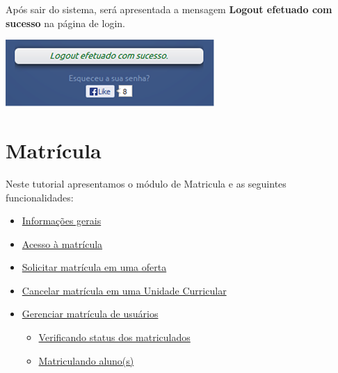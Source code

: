\documentclass[letterpaper,10pt,english]{sphinxmanual}
\begin{document}
Após sair do sistema, será apresentada a mensagem \textbf{Logout efetuado com sucesso} na página de login.

{\hfill\includegraphics{logout-02.png}\hfill}


\section{Matrícula}
\label{enrollment:matricula}\label{enrollment:enrollment}\label{enrollment::doc}
Neste tutorial apresentamos o módulo de Matricula e as seguintes funcionalidades:
\begin{itemize}
\item {} 
{\hyperref[enrollment:informacoes-gerais]{Informações gerais}}

\item {} 
{\hyperref[enrollment:acesso-a-matricula]{Acesso à matrícula}}

\item {} 
{\hyperref[enrollment:solicitar-matricula-em-uma-oferta]{Solicitar matrícula em uma oferta}}

\item {} 
{\hyperref[enrollment:cancelar-matricula-em-uma-unidade-curricular]{Cancelar matrícula em uma Unidade Curricular}}

\item {} 
{\hyperref[enrollment:gerenciar-matricula-de-usuarios]{Gerenciar matrícula de usuários}}
\begin{itemize}
\item {} 
{\hyperref[enrollment:verificando-status-dos-matriculados]{Verificando status dos matriculados}}

\item {} 
{\hyperref[enrollment:matriculando-aluno-s]{Matriculando aluno(s)}}

\end{itemize}

\end{itemize}
\end{document}
